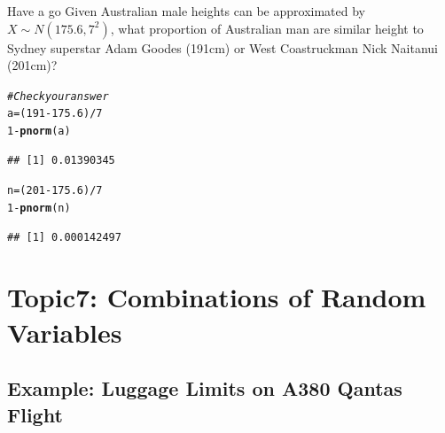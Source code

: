 \documentclass[t,xcolor=pdftex,dvipsnames,table]{beamer}\usepackage[]{graphicx}\usepackage[]{color}
\makeatletter
\newcommand{\hlnum}[1]{\textcolor[rgb]{0.686,0.059,0.569}{#1}}%
\newcommand{\hlcom}[1]{\textcolor[rgb]{0.678,0.584,0.686}{\textit{#1}}}%
\newcommand{\hlopt}[1]{\textcolor[rgb]{0,0,0}{#1}}%
\newcommand{\hlstd}[1]{\textcolor[rgb]{0.345,0.345,0.345}{#1}}%
\newcommand{\hlkwb}[1]{\textcolor[rgb]{0.69,0.353,0.396}{#1}}%
\newcommand{\hlkwd}[1]{\textcolor[rgb]{0.737,0.353,0.396}{\textbf{#1}}}%
\newenvironment{kframe}{%
 \def\at@end@of@kframe{}%
 \ifinner\ifhmode%
  \def\at@end@of@kframe{\end{minipage}}%
  \begin{minipage}{\columnwidth}%
 \fi\fi%
 \def\FrameCommand##1{\hskip\@totalleftmargin \hskip-\fboxsep
 \colorbox{shadecolor}{##1}\hskip-\fboxsep
     \hskip-\linewidth \hskip-\@totalleftmargin \hskip\columnwidth}%
 \MakeFramed {\advance\hsize-\width
   \@totalleftmargin\z@ \linewidth\hsize
   \@setminipage}}%
 {\par\unskip\endMakeFramed%
 \at@end@of@kframe}
\newenvironment{knitrout}{}{} %
\makeatother
\begin{document}
\begin{frame}[fragile]\frametitle{}

\begin{alertblock}{Have a go}
Given Australian male heights can be approximated by $X \sim N(175.6,7^2)$, what proportion of Australian man are similar height to Sydney superstar Adam Goodes (191cm) or West Coastruckman Nick Naitanui (201cm)?

\end{alertblock}

\begin{knitrout}
\color{fgcolor}\begin{kframe}
\begin{alltt}
\hlcom{#Check your answer}
\hlstd{a} \hlkwb{=} \hlstd{(}\hlnum{191}\hlopt{-}\hlnum{175.6}\hlstd{)}\hlopt{/}\hlnum{7}
\hlnum{1}\hlopt{-} \hlkwd{pnorm}\hlstd{(a)}
\end{alltt}
\begin{verbatim}
## [1] 0.01390345
\end{verbatim}
\begin{alltt}
\hlstd{n} \hlkwb{=} \hlstd{(}\hlnum{201}\hlopt{-}\hlnum{175.6}\hlstd{)}\hlopt{/}\hlnum{7}
\hlnum{1}\hlopt{-} \hlkwd{pnorm}\hlstd{(n)}
\end{alltt}
\begin{verbatim}
## [1] 0.000142497
\end{verbatim}
\end{kframe}
\end{knitrout}
\end{frame}






\section[7]{Topic7: Combinations of Random Variables}

\subsection[Example: Luggage Limits on A380 Flight]{Example: Luggage Limits on A380 Qantas Flight}
\end{document}
